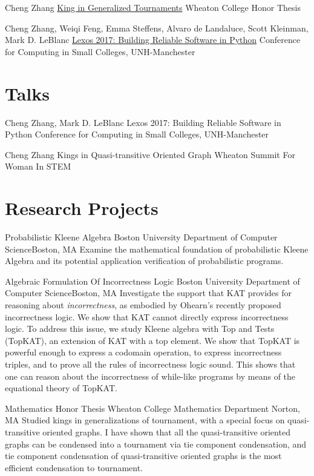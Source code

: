 \documentclass[11pt,roman]{moderncv}        %
\begin{document}
{Cheng Zhang}
{\href{http://hdl.handle.net/11040/24570}{King in Generalized Tournaments}}
{Wheaton College Honor Thesis}
{}{}

{Cheng Zhang, Weiqi Feng, Emma Steffens, Alvaro de Landaluce, Scott Kleinman, Mark D. LeBlanc}
{\href{https://dl.acm.org/doi/10.5555/3205191.3205205}{Lexos 2017: Building Reliable Software in Python}}
{Conference for Computing in Small Colleges, UNH-Manchester}
{}{}


\section{Talks}

{Cheng Zhang, Mark D. LeBlanc}
{Lexos 2017: Building Reliable Software in Python}
{Conference for Computing in Small Colleges, UNH-Manchester}
{}{}

{Cheng Zhang}
{Kings in Quasi-transitive Oriented Graph}
{Wheaton Summit For Woman In STEM}
{}{}


\section{Research Projects}

{Probabilistic Kleene Algebra}
{Boston University Department of Computer Science}{Boston, MA}{}
{Examine the mathematical foundation of probabilistic Kleene Algebra 
and its potential application verification of probabilistic programs.}

{Algebraic Formulation Of Incorrectness Logic}
{Boston University Department of Computer Science}{Boston, MA}{}
{Investigate the support that KAT provides for reasoning about \emph{incorrectness}, 
as embodied by Ohearn's recently proposed incorrectness logic. 
We show that KAT cannot directly express incorrectness logic. 
To address this issue, we study Kleene algebra with Top and Tests (TopKAT), 
an extension of KAT with a top element. 
We show that TopKAT is powerful enough to express a codomain operation, 
to express incorrectness triples, 
and to prove all the rules of incorrectness logic sound. 
This shows that one can reason about the incorrectness of while-like programs 
by means of the equational theory of TopKAT\@. }

{Mathematics Honor Thesis}
{Wheaton College Mathematics Department}
{Norton, MA}{}
{Studied kings in generalizations of tournament,
with a special focus on quasi-transitive oriented graphs.
I have shown that all the quasi-transitive oriented graphs
can be condensed into a tournament via tie component condensation, 
and tie component condensation of quasi-transitive 
oriented graphs is the most efficient condensation to tournament.
}
\end{document}
